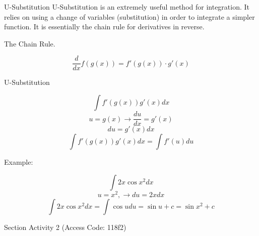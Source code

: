 \documentclass{beamer}
\begin{document}
\begin{frame}{U-Substitution}
\scriptsize{
U-Substitution is an extremely useful method for integration. It relies on using a change of variables (substitution) in order to integrate a simpler function. It is essentially the chain rule for derivatives in reverse. }

\normalsize
\vspace{10pt}


The Chain Rule. 

\[
    \frac{d}{dx} f(g(x)) = f'(g(x)) \cdot g'(x)
\]


\end{frame}

\begin{frame}{U-Substitution}

\[
    \int f'(g(x))g'(x) dx
\]
\[
    u = g(x) \to \frac{du}{dx} = g'(x)
\]
\[
    du = g'(x)dx
\]
\[
    \int f'(g(x))g'(x) dx = \int f'(u)du
\]

Example: 

\[
\int 2x\cos{x^2}dx
\]
\[
    u = x^2, \to du = 2xdx
\]
\[
    \int 2x\cos{x^2}dx = \int \cos{u} du = \sin{u} + c = \sin{x^2} + c
\]

\end{frame}

\begin{frame}{Section Activity 2 (Access Code: 118f2)}
    
\end{frame}
\end{document}
